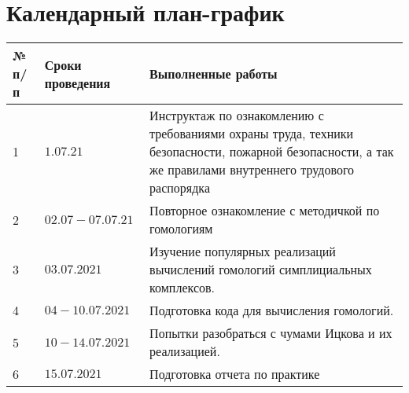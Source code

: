 \section{Календарный план-график}


\begin{table}[h!]
\centering
\begin{tabular}{ | m{0.75cm} | m{3.5cm} | m{10.5cm} |}
\hline

№ п/п & Сроки проведения & Выполненные работы   \\
\hline
1 & $1.07.21$ &  Инструктаж по ознакомлению с требованиями охраны труда, техники безопасности, пожарной безопасности, а так же правилами внутреннего трудового распорядка  \\ 
\hline 
2 & $02.07-07.07.21$ &  Повторное ознакомление с методичкой по гомологиям   \\
\hline
3 & $03.07.2021$ & Изучение популярных реализаций вычислений гомологий симплициальных комплексов.  \\
\hline
4 & $04-10.07.2021$ &  Подготовка кода для вычисления гомологий.  \\
\hline
5 & $10-14.07.2021$ & Попытки разобраться с чумами Ицкова и их реализацией. \\
\hline
6 & $15.07.2021$ & Подготовка отчета по практике \\
\hline
\end{tabular}
\end{table}